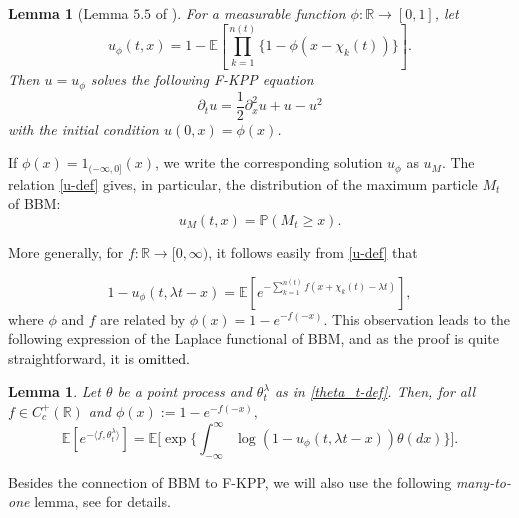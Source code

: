 \documentclass[a4paper,reqno]{amsart}%
\newcommand{\1}{\mathbf 1}
\theoremstyle{mine}
\numberwithin{theorem}{section}
\newtheorem{lemma}[theorem]{Lemma}
\numberwithin{equation}{section}
\theoremstyle{remark}
\begin{document}
\begin{lemma}[Lemma $5.5$ of \cite{Bovier_book}]\label{BBM-F-KPP-Connection}
For a measurable function $\phi:\mathbb{R} \to [0,1]$, let
\begin{equation}\label{u-def}
u_\phi(t,x) = 1 - \mathbb{E}[\prod_{k=1}^{n(t)}\{1-\phi(x- \chi_k(t))\}].
\end{equation}
Then $u = u_\phi$ solves the following F-KPP equation
\begin{equation}\label{F-KPP}
\partial_t u = \frac{1}{2}\partial_x^2 u + u- u^2
\end{equation}
 with the initial condition $u(0,x) = \phi(x)$.
 \end{lemma}
 
If $\phi (x) =1_{(-\infty, 0]}(x)$, we write the corresponding solution $u_\phi$ as $u_M$. The relation \eqref{u-def} gives, in particular, the distribution of the maximum particle $M_t$ of BBM: 
 \begin{equation}\label{F-KPP-Formula-For-M}
    u_M(t,x) = \mathbb{P}(M_t \ge x). 
\end{equation}
 
More generally, for $f:\mathbb{R} \to [0,\infty)$, it follows easily from \eqref{u-def} that 

\begin{equation}\label{Laplace-comp-using-F-KPP-Step-1}
     1- u_\phi(t, \lambda t -x) = \mathbb{E}[e^{-\sum_{k=1}^{n(t)} f(x + \chi_k(t) -\lambda t )}],
\end{equation}
where $\phi$ and $f$ are related by $\phi(x) = 1 - e^{-f(-x)}$. This observation leads to the following expression of the Laplace functional of BBM, and as the proof is quite straightforward, it is \textcolor{black}{omitted}.
\begin{lemma}\label{Formula-for-Laplace-of-theta_t}
    Let $\theta$ be a point process and  $\theta_t^\lambda$ as in \eqref{theta_t-def}. Then, for all $f\in C_c^+(\mathbb R)$ and $\phi(x):=1-e^{-f(-x)},$
    \begin{equation}\label{Laplace-comp-using-F-KPP}
\mathbb{E}[e^{-\langle f,\theta_t^\lambda\rangle}] = \mathbb{E}\biggl[\exp\biggl\{\int_{-\infty}^\infty\log(1- u_\phi(t, \lambda t -x))\theta(dx)\biggr\}\biggr].
\end{equation}
\end{lemma}


Besides the connection of BBM to F-KPP, we will also use the following \textit{many-to-one} lemma, see \cite{Harris_manytofew} for details. 
\end{document}

